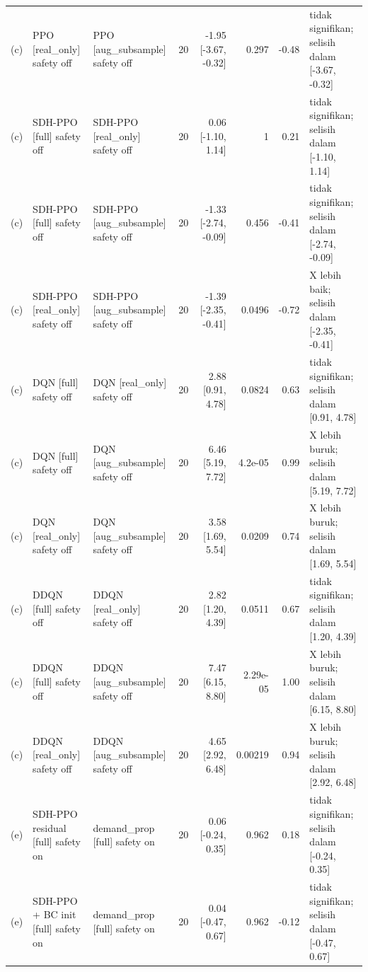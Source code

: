 \begin{table}[t]
\begin{tabular}{llllrrrl}
(c) & PPO [real\_only] safety off & PPO [aug\_subsample] safety off & 20 & -1.95 [-3.67, -0.32] & 0.297 & -0.48 & tidak signifikan; selisih dalam [-3.67, -0.32] \\
(c) & SDH-PPO [full] safety off & SDH-PPO [real\_only] safety off & 20 & 0.06 [-1.10, 1.14] & 1 & 0.21 & tidak signifikan; selisih dalam [-1.10, 1.14] \\
(c) & SDH-PPO [full] safety off & SDH-PPO [aug\_subsample] safety off & 20 & -1.33 [-2.74, -0.09] & 0.456 & -0.41 & tidak signifikan; selisih dalam [-2.74, -0.09] \\
(c) & SDH-PPO [real\_only] safety off & SDH-PPO [aug\_subsample] safety off & 20 & -1.39 [-2.35, -0.41] & 0.0496 & -0.72 & X lebih baik; selisih dalam [-2.35, -0.41] \\
(c) & DQN [full] safety off & DQN [real\_only] safety off & 20 & 2.88 [0.91, 4.78] & 0.0824 & 0.63 & tidak signifikan; selisih dalam [0.91, 4.78] \\
(c) & DQN [full] safety off & DQN [aug\_subsample] safety off & 20 & 6.46 [5.19, 7.72] & 4.2e-05 & 0.99 & X lebih buruk; selisih dalam [5.19, 7.72] \\
(c) & DQN [real\_only] safety off & DQN [aug\_subsample] safety off & 20 & 3.58 [1.69, 5.54] & 0.0209 & 0.74 & X lebih buruk; selisih dalam [1.69, 5.54] \\
(c) & DDQN [full] safety off & DDQN [real\_only] safety off & 20 & 2.82 [1.20, 4.39] & 0.0511 & 0.67 & tidak signifikan; selisih dalam [1.20, 4.39] \\
(c) & DDQN [full] safety off & DDQN [aug\_subsample] safety off & 20 & 7.47 [6.15, 8.80] & 2.29e-05 & 1.00 & X lebih buruk; selisih dalam [6.15, 8.80] \\
(c) & DDQN [real\_only] safety off & DDQN [aug\_subsample] safety off & 20 & 4.65 [2.92, 6.48] & 0.00219 & 0.94 & X lebih buruk; selisih dalam [2.92, 6.48] \\
(e) & SDH-PPO residual [full] safety on & demand\_prop [full] safety on & 20 & 0.06 [-0.24, 0.35] & 0.962 & 0.18 & tidak signifikan; selisih dalam [-0.24, 0.35] \\
(e) & SDH-PPO + BC init [full] safety on & demand\_prop [full] safety on & 20 & 0.04 [-0.47, 0.67] & 0.962 & -0.12 & tidak signifikan; selisih dalam [-0.47, 0.67] \\
\bottomrule
\end{tabular}
\end{table}